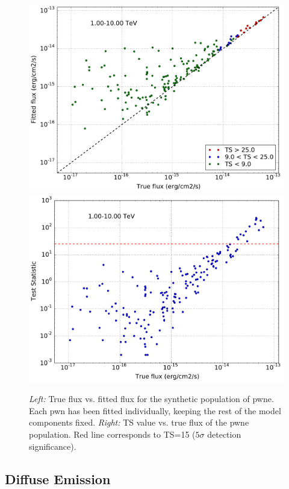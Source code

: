 \documentclass[main.tex]{subfiles}
\begin{document}
\begin{figure}
\centering
{}
\includegraphics[width=1\textwidth]{Pictures/Flux_pop.pdf}
\endminipage 
{}
\includegraphics[width=1\textwidth]{Pictures/TS_pop.pdf}
\endminipage
  \caption{\textit{Left:} True flux vs. fitted flux for the synthetic population of \gls{pwne}. Each \gls{pwn} has been fitted individually, keeping the rest of the model components fixed. \textit{Right:} TS value vs. true flux of the \gls{pwne} population. Red line corresponds to TS=15 ($5\sigma$ detection significance).}
    \label{fig:pwnepopresults}
\end{figure}

\subsection{Diffuse Emission}
\end{document}
